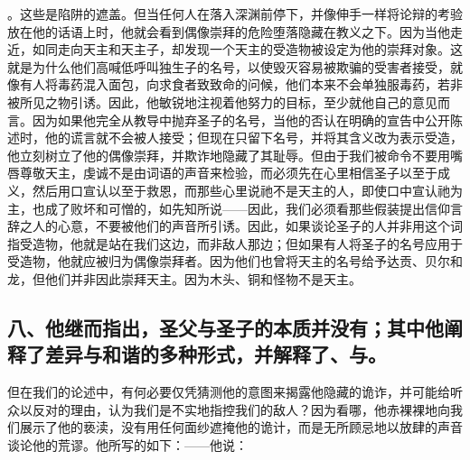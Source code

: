 。这些是陷阱的遮盖。但当任何人在落入深渊前停下，并像伸手一样将论辩的考验放在他的话语上时，他就会看到偶像崇拜的危险堕落隐藏在教义之下。因为当他走近，如同走向天主和天主子，却发现一个天主的受造物被设定为他的崇拜对象。这就是为什么他们高喊低呼叫独生子的名号，以使毁灭容易被欺骗的受害者接受，就像有人将毒药混入面包，向求食者致致命的问候，他们本来不会单独服毒药，若非被所见之物引诱。因此，他敏锐地注视着他努力的目标，至少就他自己的意见而言。因为如果他完全从教导中抛弃圣子的名号，当他的否认在明确的宣告中公开陈述时，他的谎言就不会被人接受；但现在只留下名号，并将其含义改为表示受造，他立刻树立了他的偶像崇拜，并欺诈地隐藏了其耻辱。但由于我们被命令不要用嘴唇尊敬天主，虔诚不是由词语的声音来检验，而必须先在心里相信圣子以至于成义，然后用口宣认以至于救恩，而那些心里说祂不是天主的人，即使口中宣认祂为主，也成了败坏和可憎的，如先知所说——因此，我们必须看那些假装提出信仰言辞之人的心意，不要被他们的声音所引诱。因此，如果谈论圣子的人并非用这个词指受造物，他就是站在我们这边，而非敌人那边；但如果有人将圣子的名号应用于受造物，他就应被归为偶像崇拜者。因为他们也曾将天主的名号给予达贡、贝尔和龙，但他们并非因此崇拜天主。因为木头、铜和怪物不是天主。\par


\subsection{八、他继而指出，圣父与圣子的本质并没有；其中他阐释了差异与和谐的多种形式，并解释了、与。}

但在我们的论述中，有何必要仅凭猜测他的意图来揭露他隐藏的诡诈，并可能给听众以反对的理由，认为我们是不实地指控我们的敌人？因为看哪，他赤裸裸地向我们展示了他的亵渎，没有用任何面纱遮掩他的诡计，而是无所顾忌地以放肆的声音谈论他的荒谬。他所写的如下：——他说：\par

